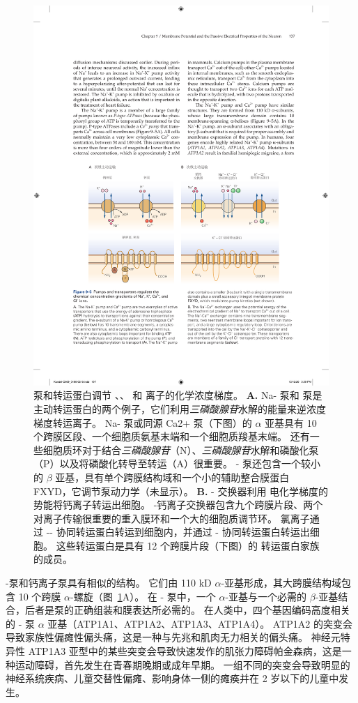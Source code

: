 \begin{figure}[htbp]
	\centering
	\includegraphics[width=0.9\linewidth]{chap09/fig_9_5}
	\caption{泵和转运蛋白调节 、、 和  离子的化学浓度梯度。
		\textbf{A.} Na- 泵和  泵是主动转运蛋白的两个例子，它们利用\textit{三磷酸腺苷}水解的能量来逆浓度梯度转运离子。
		Na- 泵或同源 Ca2+ 泵（下图）的 $\alpha$ 亚基具有 10 个跨膜区段、一个细胞质氨基末端和一个细胞质羧基末端。
		还有一些细胞质环对于结合\textit{三磷酸腺苷}（N）、\textit{三磷酸腺苷}水解和磷酸化泵（P）以及将磷酸化转导至转运（A）很重要。
		- 泵还包含一个较小的 $\beta$ 亚基，具有单个跨膜结构域和一个小的辅助整合膜蛋白 FXYD，它调节泵动力学（未显示）。
		\textbf{B.} - 交换器利用  电化学梯度的势能将钙离子转运出细胞。
		-钙离子交换器包含九个跨膜片段、两个对离子传输很重要的重入膜环和一个大的细胞质调节环。
		氯离子通过 -- 协同转运蛋白转运到细胞内，并通过 - 协同转运蛋白转运出细胞。
		这些转运蛋白是具有 12 个跨膜片段（下图）的  转运蛋白家族的成员。}
	\label{fig:9_5}
\end{figure}


-泵和钙离子泵具有相似的结构。
它们由 110 kD $\alpha$-亚基形成，其大跨膜结构域包含 10 个跨膜 $\alpha$-螺旋（图~\ref{fig:9_5}A）。
在 - 泵中，一个 $\alpha$-亚基与一个必需的 $\beta$-亚基结合，后者是泵的正确组装和膜表达所必需的。
在人类中，四个基因编码高度相关的 - 泵 $\alpha$ 亚基（ATP1A1、ATP1A2、ATP1A3、ATP1A4）。
ATP1A2 的突变会导致家族性偏瘫性偏头痛，这是一种与先兆和肌肉无力相关的偏头痛。
神经元特异性 ATP1A3 亚型中的某些突变会导致快速发作的肌张力障碍帕金森病，这是一种运动障碍，首先发生在青春期晚期或成年早期。
一组不同的突变会导致明显的神经系统疾病、儿童交替性偏瘫、影响身体一侧的瘫痪并在 2 岁以下的儿童中发生。


